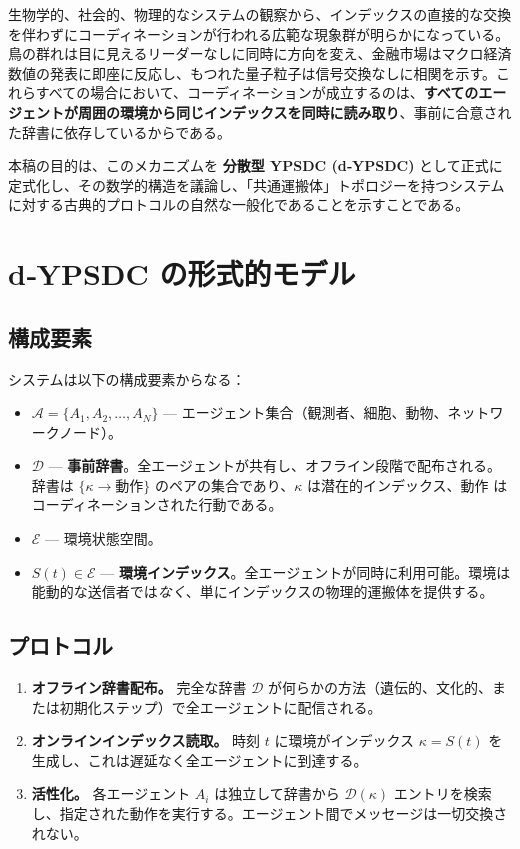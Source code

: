 \documentclass[11pt,a4paper]{article}
\begin{document}
	生物学的、社会的、物理的なシステムの観察から、インデックスの直接的な交換を伴わずにコーディネーションが行われる広範な現象群が明らかになっている。鳥の群れは目に見えるリーダーなしに同時に方向を変え、金融市場はマクロ経済数値の発表に即座に反応し、もつれた量子粒子は信号交換なしに相関を示す。これらすべての場合において、コーディネーションが成立するのは、\textbf{すべてのエージェントが周囲の環境から同じインデックスを同時に読み取り}、事前に合意された辞書に依存しているからである。
	
	本稿の目的は、このメカニズムを \textbf{分散型 YPSDC (d‑YPSDC)} として正式に定式化し、その数学的構造を議論し、「共通運搬体」トポロジーを持つシステムに対する古典的プロトコルの自然な一般化であることを示すことである。
	
	\section{d‑YPSDC の形式的モデル}
	
	\subsection{構成要素}
	
	システムは以下の構成要素からなる：
	
	\begin{itemize}[leftmargin=*]
		\item \(\mathcal{A} = \{A_1, A_2, \dots, A_N\}\) — エージェント集合（観測者、細胞、動物、ネットワークノード）。
		\item \(\mathcal{D}\) — \textbf{事前辞書}。全エージェントが共有し、オフライン段階で配布される。辞書は \(\{ \kappa \to \text{動作} \}\) のペアの集合であり、\(\kappa\) は潜在的インデックス、\(\text{動作}\) はコーディネーションされた行動である。
		\item \(\mathcal{E}\) — 環境状態空間。
		\item \(S(t) \in \mathcal{E}\) — \textbf{環境インデックス}。全エージェントが同時に利用可能。環境は能動的な送信者では\emph{なく}、単にインデックスの物理的運搬体を提供する。
	\end{itemize}
	
	\subsection{プロトコル}
	
	\begin{enumerate}[leftmargin=*, label=\textbf{段階 \arabic*:}]
		\item \textbf{オフライン辞書配布。} 完全な辞書 \(\mathcal{D}\) が何らかの方法（遺伝的、文化的、または初期化ステップ）で全エージェントに配信される。
		\item \textbf{オンラインインデックス読取。} 時刻 \(t\) に環境がインデックス \(\kappa = S(t)\) を生成し、これは遅延なく全エージェントに到達する。
		\item \textbf{活性化。} 各エージェント \(A_i\) は独立して辞書から \(\mathcal{D}(\kappa)\) エントリを検索し、指定された動作を実行する。エージェント間でメッセージは一切交換されない。
	\end{enumerate}
	
\end{document}
